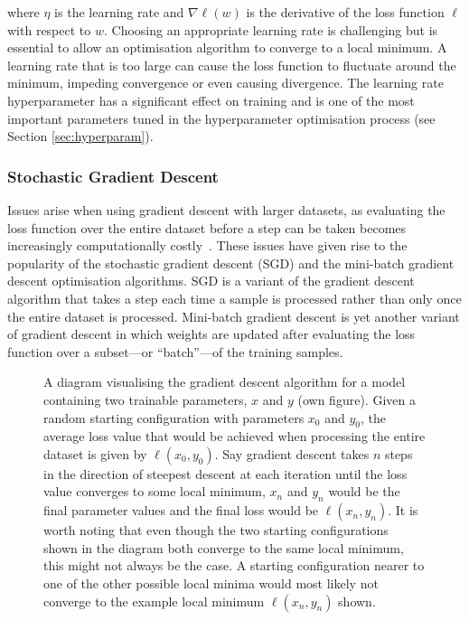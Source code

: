 \noindent
where $\eta$ is the learning rate and $\nabla\ell(w)$ is the derivative of the loss function $\ell$ with respect to $w$. Choosing an appropriate learning rate is challenging but is essential to allow an optimisation algorithm to converge to a local minimum. A learning rate that is too large can cause the loss function to fluctuate around the minimum, impeding convergence or even causing divergence. The learning rate hyperparameter has a significant effect on training and is one of the most important parameters tuned in the hyperparameter optimisation process (see Section \ref{sec:hyperparam}).


\subsubsection{Stochastic Gradient Descent}

Issues arise when using gradient descent with larger datasets, as evaluating the loss function over the entire dataset before a step can be taken becomes increasingly computationally costly~\cite{gdbad}. These issues have given rise to the popularity of the stochastic gradient descent (SGD) and the mini-batch gradient descent optimisation algorithms. SGD is a variant of the gradient descent algorithm that takes a step each time a sample is processed rather than only once the entire dataset is processed. Mini-batch gradient descent is yet another variant of gradient descent in which weights are updated after evaluating the loss function over a subset---or ``batch''---of the training samples.

\begin{figure}[t]
    \centering
    
    \caption{A diagram visualising the gradient descent algorithm for a model containing two trainable parameters, $x$ and $y$ (own figure). Given a random starting configuration with parameters $x_0$ and $y_0$, the average loss value that would be achieved when processing the entire dataset is given by $\ell(x_0, y_0)$. Say gradient descent takes $n$ steps in the direction of steepest descent at each iteration until the loss value converges to some local minimum, $x_n$ and $y_n$ would be the final parameter values and the final loss would be $\ell(x_n, y_n)$. It is worth noting that even though the two starting configurations shown in the diagram both converge to the same local minimum, this might not always be the case. A starting configuration nearer to one of the other possible local minima would most likely not converge to the example local minimum $\ell(x_n, y_n)$ shown.}
    \label{fig:gd}
\end{figure}

